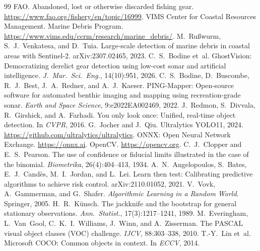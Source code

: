 \documentclass[10pt,twocolumn,letterpaper]{article}
\makeatletter
\newcommand{\etal}{et~al.\@}
\makeatother
\begin{document}
{\small
\begin{thebibliography}{99}\setlength{\itemsep}{0pt}
 FAO. Abandoned, lost or otherwise discarded fishing gear.
\url{https://www.fao.org/fishery/en/topic/16999}.
 VIMS Center for Coastal Resources Management. Marine Debris
Program. \url{https://www.vims.edu/ccrm/research/marine_debris/}.
 M.~Rußwurm, S.~J.~Venkatesa, and D.~Tuia. Large-scale
detection of marine debris in coastal areas with Sentinel-2. arXiv:2307.02465,
2023.
 C.~S.~Bodine \etal{} GhostVision: Democratizing derelict
gear detection using low-cost sonar and artificial intelligence. \emph{J.\ Mar.\
Sci.\ Eng.}, 14(10):951, 2026.
 C.~S.~Bodine, D.~Buscombe, R.~J.~Best, J.~A.~Redner, and
A.~J.~Kaeser. PING-Mapper: Open-source software for automated benthic imaging and
mapping using recreation-grade sonar. \emph{Earth and Space Science},
9:e2022EA002469, 2022.
 J.~Redmon, S.~Divvala, R.~Girshick, and A.~Farhadi. You only look
once: Unified, real-time object detection. In \emph{CVPR}, 2016.
\bibitem{yolo11} G.~Jocher and J.~Qiu. Ultralytics YOLO11, 2024.
\url{https://github.com/ultralytics/ultralytics}.
 ONNX: Open Neural Network Exchange. \url{https://onnx.ai}.
\bibitem{opencv} OpenCV. \url{https://opencv.org}.
 C.~J.~Clopper and E.~S.~Pearson. The use of confidence or
fiducial limits illustrated in the case of the binomial. \emph{Biometrika},
26(4):404--413, 1934.
 A.~N.~Angelopoulos, S.~Bates, E.~J.~Candès, M.~I.~Jordan, and
L.~Lei. Learn then test: Calibrating predictive algorithms to achieve risk
control. arXiv:2110.01052, 2021.
 V.~Vovk, A.~Gammerman, and G.~Shafer. \emph{Algorithmic Learning
in a Random World}. Springer, 2005.
 H.~R.~Künsch. The jackknife and the bootstrap for general
stationary observations. \emph{Ann.\ Statist.}, 17(3):1217--1241, 1989.
\bibitem{voc} M.~Everingham, L.~Van~Gool, C.~K.~I.~Williams, J.~Winn, and
A.~Zisserman. The PASCAL visual object classes (VOC) challenge. \emph{IJCV},
88:303--338, 2010.
 T.-Y.~Lin \etal{} Microsoft COCO: Common objects in context. In
\emph{ECCV}, 2014.
\end{thebibliography}
}
\end{document}
